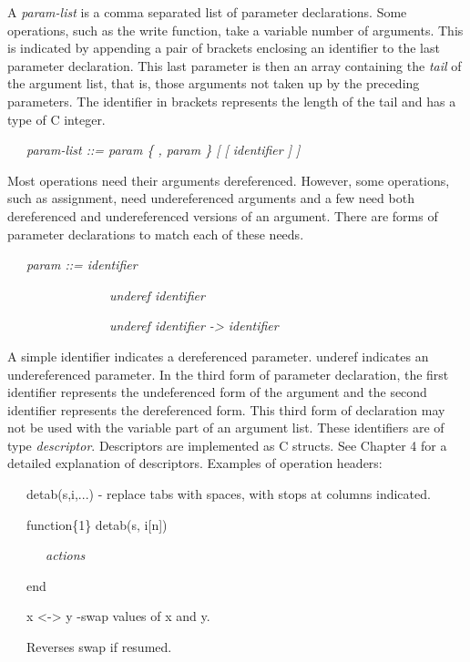 A \textit{param-list} is a comma separated list of parameter
declarations. Some operations, such as the write function, take a
variable number of arguments. This is indicated by appending a pair of
brackets enclosing an identifier to the last parameter
declaration. This last parameter is then an array containing the
\textit{tail} of the argument list, that is, those arguments not taken
up by the preceding parameters. The identifier in brackets represents
the length of the tail and has a type of C integer.

{\ttfamily\mdseries
\ \ \ \textit{param-list ::= param \{ , param \} [ [ identifier ] ]}}


Most operations need their arguments dereferenced. However, some
operations, such as assignment, need undereferenced arguments and a
few need both dereferenced and undereferenced versions of an
argument. There are forms of parameter declarations to match each of
these needs.

{\ttfamily\mdseries
\ \ \ \textit{param ::= identifier {\textbar}}}

{\ttfamily\mdseries
\ \ \ \ \ \ \ \ \ \ \ \ \ \ \ \ \textit{underef identifier {\textbar}}}

{\ttfamily\mdseries
\ \ \ \ \ \ \ \ \ \ \ \ \ \ \ \ \textit{underef identifier -{\textgreater} identifier}}


A simple identifier indicates a dereferenced parameter. underef
indicates an undereferenced parameter. In the third form of parameter
declaration, the first identifier represents the undeferenced form of
the argument and the second identifier represents the dereferenced
form. This third form of declaration may not be used with the variable
part of an argument list. These identifiers are of type
\textit{descriptor}. Descriptors are implemented as C structs. See
Chapter 4 for a detailed explanation of descriptors. Examples of
operation headers:

{\ttfamily\mdseries
\ \ \ detab(s,i,...) - replace tabs with spaces, with stops at columns indicated.}

{\ttfamily\mdseries
\ \ \ function\{1\} detab(s, i[n])}

{\ttfamily\mdseries
\ \ \ \ \ \ \textit{actions}}

{\ttfamily\mdseries
\ \ \ end}


\bigskip

{\ttfamily\mdseries
\ \ \ x {\textless}-{\textgreater} y -swap values of x and y.}

{\ttfamily\mdseries
\ \ \ Reverses swap if resumed.}

